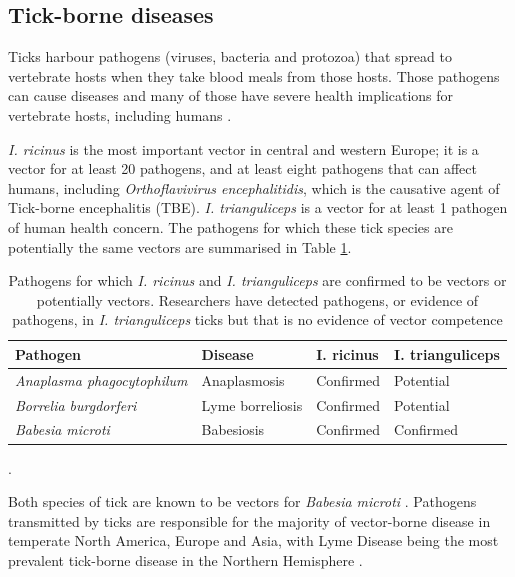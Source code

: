 \documentclass{article}
\begin{document}
\subsection{Tick-borne diseases}

Ticks harbour pathogens (viruses, bacteria and protozoa) that spread to vertebrate hosts when they take blood meals from those hosts. Those pathogens can cause diseases and many of those have severe health implications for vertebrate hosts, including humans \cite{Johnson2023e}.

\textit{I. ricinus} is the most important vector in central and western Europe; it is a vector for at least 20 pathogens, and at least eight pathogens that can affect humans, including \textit{Orthoflavivirus encephalitidis}, which is the causative agent of Tick-borne encephalitis (TBE). \textit{I. trianguliceps} is a vector for at least 1 pathogen of human health concern. The pathogens for which these tick species are potentially the same vectors are summarised in Table \ref{tab:common_pathogens}.

\begin{table}[]
	\begin{mdframed}[backgroundcolor=grey250,rightline=false,leftline=false,topline=false]
	\centering
		\begin{tabular}{|l|l|l|l|}
			\hline
			\textbf{Pathogen}                  & \textbf{Disease} & \textbf{I. ricinus} & \textbf{I. trianguliceps} \\ \hline
			\textit{Anaplasma phagocytophilum} & Anaplasmosis     & Confirmed           & Potential                \\ \hline
			\textit{Borrelia burgdorferi}      & Lyme borreliosis & Confirmed           & Potential                \\ \hline
			\textit{Babesia microti}           & Babesiosis       & Confirmed           & Confirmed                 \\ \hline
		\end{tabular}
		\caption{Pathogens for which \textit{I. ricinus} and \textit{I. trianguliceps} are confirmed to be vectors or potentially vectors. Researchers have detected pathogens, or evidence of pathogens, in \textit{I. trianguliceps} ticks but that is no evidence of vector competence \cite{Gray2024, Rubel_2023}}.
		\label{tab:common_pathogens}
	\end{mdframed}
\end{table}

Both species of tick are known to be vectors for \textit{Babesia microti} \cite{Gray2024, Rubel_2023}. Pathogens transmitted by ticks are responsible for the majority of vector-borne disease in temperate North America, Europe and Asia, with Lyme Disease being the most prevalent tick-borne disease in the Northern Hemisphere \cite{Rochlin2020}. 
\end{document}
